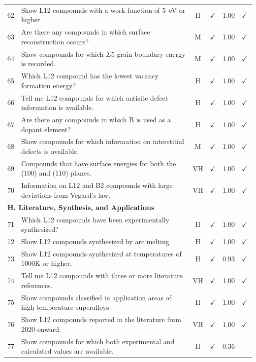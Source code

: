 \documentclass[5p,twocolumn]{elsarticle}
\begin{document}
\begin{longtable}{clcccl}
    62 & Show L12 compounds with a work function of 5~eV or higher. & H & $\checkmark$ & 1.00 & $\checkmark$ \\
    63 & Are there any compounds in which surface reconstruction occurs? & M & $\checkmark$ & 1.00 & $\checkmark$ \\
    64 & Show compounds for which $\Sigma 5$ grain-boundary energy is recorded. & M & $\checkmark$ & 1.00 & $\checkmark$ \\
    65 & Which L12 compound has the lowest vacancy formation energy? & H & $\checkmark$ & 1.00 & $\checkmark$ \\
    66 & Tell me L12 compounds for which antisite defect information is available. & H & $\checkmark$ & 1.00 & $\checkmark$ \\
    67 & Are there any compounds in which B is used as a dopant element? & H & $\checkmark$ & 1.00 & $\checkmark$ \\
    68 & Show compounds for which information on interstitial defects is available. & M & $\checkmark$ & 1.00 & $\checkmark$ \\
    69 & Compounds that have surface energies for both the (100) and (110) planes. & VH & $\checkmark$ & 1.00 & $\checkmark$ \\
    70 & Information on L12 and B2 compounds with large deviations from Vegard's law. & VH & $\checkmark$ & 1.00 & $\checkmark$ \\
    \midrule
    \multicolumn{6}{l}{\textbf{H. Literature, Synthesis, and Applications}} \\
    \midrule
    71 & Which L12 compounds have been experimentally synthesized? & H & $\checkmark$ & 1.00 & $\checkmark$ \\
    72 & Show L12 compounds synthesized by arc melting. & H & $\checkmark$ & 1.00 & $\checkmark$ \\
    73 & Show L12 compounds synthesized at temperatures of 1000K or higher. & H & $\checkmark$ & 0.93 & $\checkmark$ \\
    74 & Tell me L12 compounds with three or more literature references. & VH & $\checkmark$ & 1.00 & $\checkmark$ \\
    75 & Show compounds classified in application areas of high-temperature superalloys. & H & $\checkmark$ & 1.00 & $\checkmark$ \\
    76 & Show L12 compounds reported in the literature from 2020 onward. & VH & $\checkmark$ & 1.00 & $\checkmark$ \\
    77 & Show compounds for which both experimental and calculated values are available. & H & $\checkmark$ & 0.36 & --- \\

\end{longtable}
\end{document}
